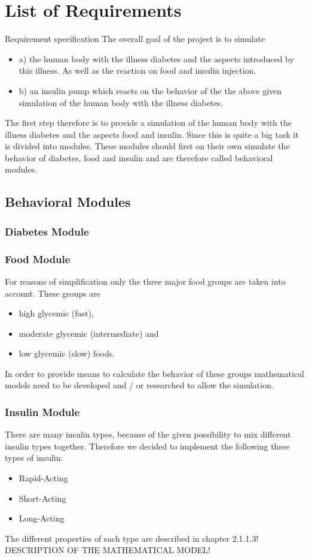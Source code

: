 \section{List of Requirements}
Requirement specification 
The overall goal of the project is to simulate
\begin{itemize}
  \item a) the human body with the illness diabetes and the aspects introduced
  by this illness. As well as the reaction on food and insulin injection.
  \item b) an insulin pump which reacts on the behavior of the the above given
  simulation of the human body with the illness diabetes.
\end{itemize}
The first step therefore is to provide a simulation of the human body with the
illness diabetes and the aspects food and insulin. 
Since this is quite a big task it is divided into modules. These modules should
first on their own simulate the behavior of diabetes, food and insulin and are
therefore called behavioral modules.

\subsection{Behavioral Modules}

\subsubsection{Diabetes Module}

\subsubsection{Food Module}
For reasons of simplification only the three major food groups are taken into
account.
These groups are 
\begin{itemize}
  \item high glycemic (fast),
  \item moderate glycemic (intermediate) and
  \item low glycemic (slow) foods.
\end{itemize}
In order to provide means to calculate the behavior of these groups
mathematical models need to be developed and / or researched to allow the
simulation.

\subsubsection{Insulin Module}
There are many insulin types, because of the given possibility to mix different 
insulin types together. Therefore we decided to implement the following three types of insulin:
\begin{itemize}
   \item Rapid-Acting
   \item Short-Acting
   \item Long-Acting
\end{itemize}
The different properties of each type are described in chapter 2.1.1.3!\\
DESCRIPTION OF THE MATHEMATICAL MODEL!\\

